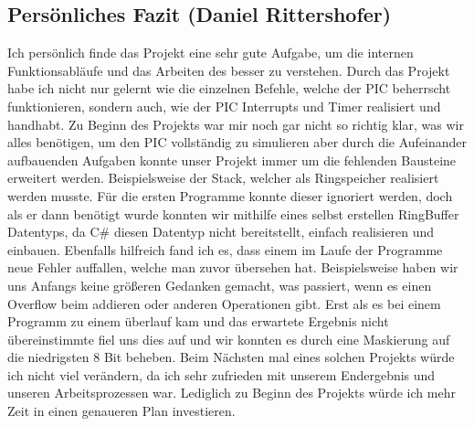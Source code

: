 \subsection{Persönliches Fazit (Daniel Rittershofer)}
Ich persönlich finde das Projekt eine sehr gute Aufgabe, um die internen Funktionsabläufe und das Arbeiten des besser zu verstehen. Durch das Projekt habe ich nicht nur gelernt wie die einzelnen Befehle, welche der PIC beherrscht funktionieren, sondern auch, wie der PIC Interrupts und Timer realisiert und handhabt. Zu Beginn des Projekts war mir noch gar nicht so richtig klar, was wir alles benötigen, um den PIC vollständig zu simulieren aber durch die Aufeinander aufbauenden Aufgaben konnte unser Projekt immer um die fehlenden Bausteine erweitert werden. Beispielsweise der Stack, welcher als Ringspeicher realisiert werden musste. Für die ersten Programme konnte dieser ignoriert werden, doch als er dann benötigt wurde konnten wir mithilfe eines selbst erstellen RingBuffer Datentyps, da C\# diesen Datentyp nicht bereitstellt, einfach realisieren und einbauen.  Ebenfalls hilfreich fand ich es, dass einem im Laufe der Programme neue Fehler auffallen, welche man zuvor übersehen hat. Beispielsweise haben wir uns Anfangs keine größeren Gedanken gemacht, was passiert, wenn es einen Overflow beim addieren oder anderen Operationen gibt. Erst als es bei einem Programm zu einem überlauf kam und das erwartete Ergebnis nicht übereinstimmte fiel uns dies auf und wir konnten es durch eine Maskierung auf die niedrigsten 8 Bit beheben. Beim Nächsten mal eines solchen Projekts würde ich nicht viel verändern, da ich sehr zufrieden mit unserem Endergebnis und unseren Arbeitsprozessen war. Lediglich zu Beginn des Projekts würde ich mehr Zeit in einen genaueren Plan investieren.

